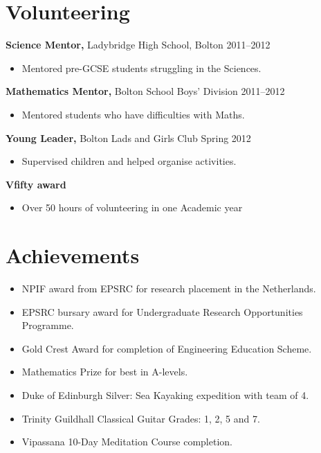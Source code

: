 \documentclass[margin]{res}
\begin{document}
\begin{resume}
\section{Volunteering} 
               {\bf Science Mentor,} Ladybridge High School, Bolton    \hfill       2011--2012
                \begin{itemize} \itemsep -2pt
              \item Mentored pre-GCSE students struggling in the Sciences.
         		\end{itemize}
		{\bf Mathematics Mentor,} Bolton School Boys' Division \hfill 2011--2012
                \begin{itemize} \itemsep -2pt
                 \item  Mentored students who have difficulties with Maths.
		 \end{itemize}
                  {\bf  Young Leader,} Bolton Lads and Girls Club    \hfill   Spring 2012
                 \begin{itemize} \itemsep -2pt
               \item    Supervised children and helped organise activities.
		\end{itemize}
	{\bf Vfifty award}
	\begin{itemize}
	\item Over 50 hours of volunteering in one Academic year 
		 \end{itemize}

\section{Achievements} 
\begin{itemize}\itemsep -2pt
  \item NPIF award from EPSRC for research placement in the Netherlands. 
\item EPSRC bursary award for Undergraduate Research Opportunities Programme.
\item Gold Crest Award for completion of Engineering Education Scheme.
\item Mathematics Prize for best in A-levels.
\item Duke of Edinburgh Silver: Sea Kayaking expedition with team of 4.
\item Trinity Guildhall Classical Guitar Grades: 1, 2, 5 and 7.
\item Vipassana 10-Day Meditation Course completion.


\end{itemize}
\end{resume}
\end{document}
